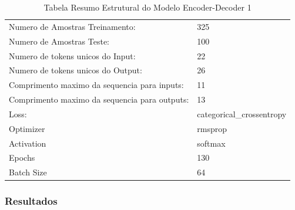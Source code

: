 \begin{table}[H]
\centering
\begin{tabular}{ll}
Numero de Amostras Treinamento: & 325 \\
Numero de Amostras Teste: & 100 \\
Numero de tokens unicos do Input: & 22 \\
Numero de tokens unicos do Output: & 26 \\
Comprimento maximo da sequencia para inputs: & 11 \\
Comprimento maximo da sequencia para outputs: & 13 \\
Loss: & categorical\_crossentropy \\
Optimizer & rmsprop \\
Activation & softmax \\
Epochs & 130 \\
Batch Size & 64
\end{tabular}
\caption{Tabela Resumo Estrutural do Modelo Encoder-Decoder 1}
\label{tab:res1}
\end{table}

\subsubsection{Resultados}

